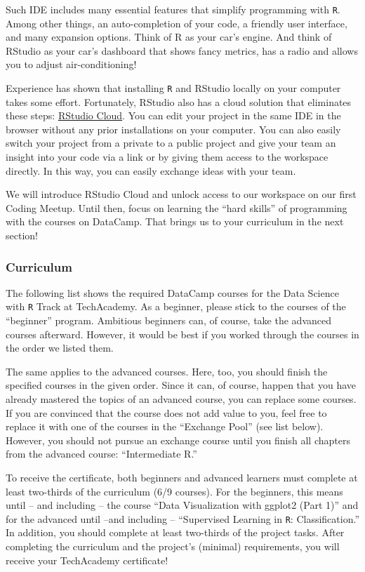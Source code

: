 \documentclass[
  11pt,
]{article}
\begin{document}
Such IDE includes many essential features that simplify programming with \texttt{R}.
Among other things, an auto-completion of your code, a friendly user interface, and many expansion options.
Think of R as your car's engine.
And think of RStudio as your car's dashboard that shows fancy metrics, has a radio and allows you to adjust air-conditioning!

Experience has shown that installing \texttt{R} and RStudio locally on your computer takes some effort.
Fortunately, RStudio also has a cloud solution that eliminates these steps: \href{https://rstudio.cloud}{RStudio Cloud}.
You can edit your project in the same IDE in the browser without any prior installations on your computer.
You can also easily switch your project from a private to a public project and give your team an insight into your code via a link or by giving them access to the workspace directly.
In this way, you can easily exchange ideas with your team.

We will introduce RStudio Cloud and unlock access to our workspace on our first Coding Meetup.
Until then, focus on learning the ``hard skills'' of programming with the courses on DataCamp.
That brings us to your curriculum in the next section!

\hypertarget{curriculum}{%
\subsubsection{Curriculum}\label{curriculum}}

The following list shows the required DataCamp courses for the Data Science with \texttt{R} Track at TechAcademy.
As a beginner, please stick to the courses of the ``beginner'' program.
Ambitious beginners can, of course, take the advanced courses afterward.
However, it would be best if you worked through the courses in the order we listed them.

The same applies to the advanced courses.
Here, too, you should finish the specified courses in the given order.
Since it can, of course, happen that you have already mastered the topics of an advanced course, you can replace some courses.
If you are convinced that the course does not add value to you, feel free to replace it with one of the courses in the ``Exchange Pool'' (see list below).
However, you should not pursue an exchange course until you finish all chapters from the advanced course: ``Intermediate R.''

To receive the certificate, both beginners and advanced learners must complete at least two-thirds of the curriculum (6/9 courses).
For the beginners, this means until -- and including -- the course ``Data Visualization with ggplot2 (Part 1)'' and for the advanced until --and including -- ``Supervised Learning in \texttt{R}: Classification.'' In addition, you should complete at least two-thirds of the project tasks.
After completing the curriculum and the project's (minimal) requirements, you will receive your TechAcademy certificate!
\end{document}
